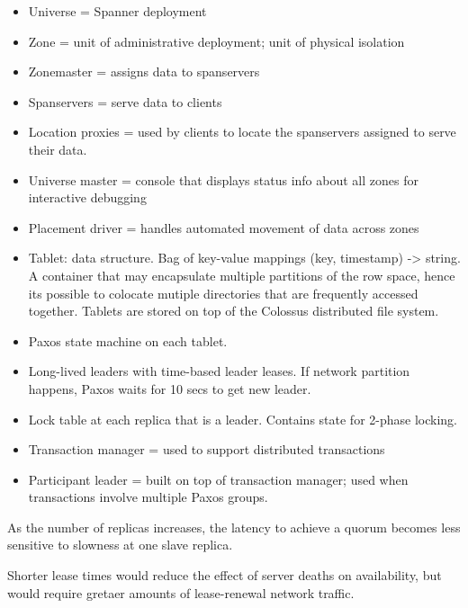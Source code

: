 \begin{itemize}
    \item Universe = Spanner deployment
    \item Zone = unit of administrative deployment; unit of physical isolation
    \item Zonemaster = assigns data to spanservers
    \item Spanservers = serve data to clients
    \item Location proxies = used by clients to locate the spanservers assigned to serve their data.
    \item Universe master = console that displays status info about all zones for interactive debugging
    \item Placement driver = handles automated movement of data across zones
    \item Tablet: data structure. Bag of key-value mappings (key, timestamp) -> string. A container that may encapsulate multiple partitions of the row space, hence its possible to colocate mutiple directories that are frequently accessed together. Tablets are stored on top of the Colossus distributed file system. 
    \item Paxos state machine on each tablet.
    \item Long-lived leaders with time-based leader leases. If network partition happens, Paxos waits for 10 secs to get new leader. 
    \item Lock table at each replica that is a leader. Contains state for 2-phase locking.
    \item Transaction manager = used to support distributed transactions
    \item Participant leader = built on top of transaction manager; used when transactions involve multiple Paxos groups.
\end{itemize}

As the number of replicas increases, the latency to achieve a quorum becomes less sensitive to slowness at one slave replica.

Shorter lease times would reduce the effect of server deaths on availability, but would require gretaer amounts of lease-renewal network traffic.
